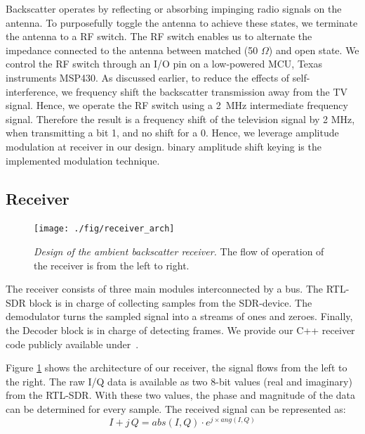 \documentclass[conference]{IEEEtran}
\begin{document}
Backscatter operates by reflecting or absorbing impinging
radio signals on the antenna. To purposefully toggle the antenna
to achieve these states, we  terminate the antenna to a 
RF switch. The RF switch enables us to alternate the impedance connected to
the antenna between matched (50 \ensuremath{\Omega}) and open state.
We control the RF switch through an I/O pin on a low-powered MCU, Texas
instruments MSP430. As discussed earlier, to reduce the effects of
self-interference, we frequency shift the backscatter transmission
away from the TV signal. Hence, we operate the RF switch using a 
\SI{2}{\mega\hertz} intermediate frequency signal. Therefore the result 
is a frequency shift of the television signal by 2 MHz, when
transmitting a bit 1, and no shift for a 0.  Hence,  we 
leverage amplitude modulation at receiver in our design.
binary amplitude shift keying is the implemented modulation technique.   
 
\subsection{Receiver}
\begin{figure}[h]
\centering
\texttt{[image: ./fig/receiver\_arch]}
\vspace{-6mm}
\caption{\emph{Design of the ambient backscatter receiver.} The flow of operation of the
receiver is from the left to right.}
\label{fig:receiver_arch}
\vspace{-6mm}
\end{figure}
The receiver consists of three main modules interconnected by a bus. The
RTL-SDR block is in charge of collecting samples from the SDR-device. The
demodulator turns the sampled signal into a streams of ones and zeroes.
Finally, the Decoder block is in charge of detecting frames. We provide our C++
receiver code publicly available under~\cite{s3xm3x_backscatterBASKReceiver}.

Figure \ref{fig:receiver_arch} shows the architecture of our receiver, the
signal flows from the left to the right.
The raw I/Q data is available as two 8-bit values (real and imaginary) from the
RTL-SDR. With these two values, the phase and magnitude of the data can be
determined for every sample. The received signal can be represented as:
\begin{equation}
	I+j\,Q = abs(I,Q) \cdot e^{j \times ang(I,Q)} 
\end{equation} 
 
\end{document}
